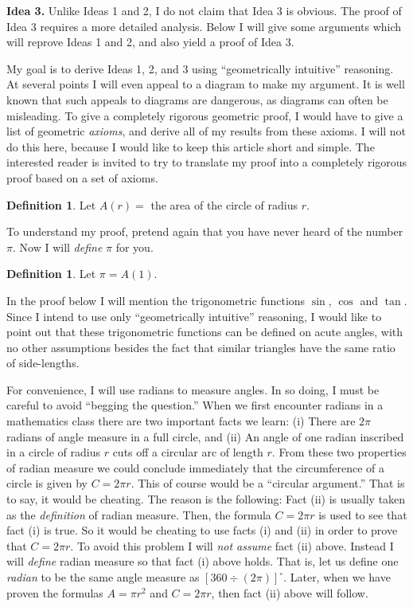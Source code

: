\documentclass[twoside,twocolumn,12pt]{amsart}
\theoremstyle{plain}
\theoremstyle{definition}
\newtheorem{Definition}[Theorem]{Definition}
\begin{document}
\vspace{0.2in}

\noindent
\textbf{Idea 3.} Unlike Ideas 1 and 2, I do not claim that Idea 3 is
obvious.
 The proof of Idea 3 requires a more
detailed analysis. Below I will give some arguments which will reprove
Ideas 1 and 2, and also yield a proof of Idea 3.

  My goal is
to derive Ideas 1, 2, and 3 using  ``geometrically intuitive''
reasoning. At several points I will even appeal to a diagram to make my
argument.
It is well known that such appeals to diagrams are dangerous, as diagrams
can often be misleading. To give a completely rigorous geometric proof,
I would have to give a list of geometric \emph{axioms}, and derive all
of my results from these axioms. I will not do this here, because I would
like to keep this article short and simple. The interested reader
is invited to try to translate my proof into a completely rigorous proof
based on a set of axioms.

\begin{Definition}
Let $A(r)= $ the area of the circle of radius $r$.
\end{Definition}

To understand my proof, pretend again
that you have never heard of the number
$\pi$. Now I will \emph{define} $\pi$ for you.

\begin{Definition}
Let $\pi=A(1)$.
\end{Definition}

In the proof below I will mention the trigonometric functions $\sin$,
$\cos$ and $\tan$. Since I intend to use only ``geometrically intuitive''
reasoning, I would like to point out that these trigonometric functions
can be defined on acute angles, with no other assumptions besides
the fact that similar triangles have the same ratio of
side-lengths.

For convenience,
I will use radians to measure angles. In so doing, I must be careful
to avoid ``begging the question.'' When we first encounter radians in
a mathematics class
there are two important facts we learn: (i) There are $2\pi$ radians of
angle measure in a full circle, and (ii) An angle of one radian inscribed
in a circle of radius $r$ cuts off a circular arc of length $r$.
 From these
two properties of radian measure
we could conclude immediately that
the
circumference of a circle is given by $C=2\pi r$.
This of course would be a ``circular argument.'' That is to say, it would
be cheating. The reason is the following:
Fact (ii) is usually taken as the \emph{definition} of radian measure.
Then, the
formula $C=2\pi r$ is used to see
that
fact (i) is true. So it would be cheating
to use facts (i) and (ii) in order to prove that
$C=2\pi r$.
To avoid this problem I will \emph{not assume}
fact (ii) above. Instead I will \emph{define} radian measure so that fact
(i) above holds. That is, let us define  one \emph{radian}
to be the same angle measure as $[360\div(2\pi)]^{\circ}.$ Later,  when we
have proven the formulas $A=\pi r^2$ and  $C=2\pi r$, then fact (ii) above
will follow.
\end{document}
